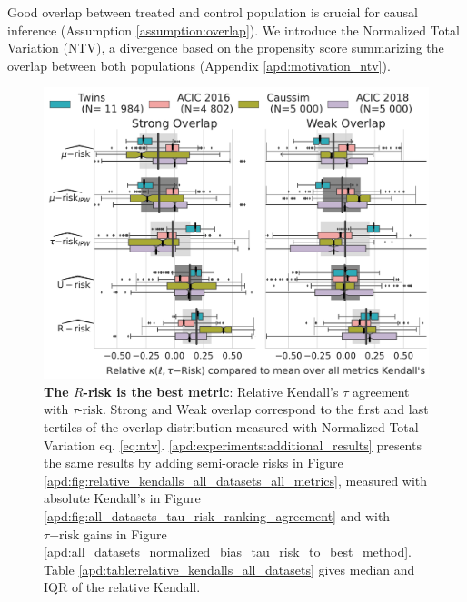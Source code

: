 \documentclass[a4paper,num-refs]{oup-contemporary}%
\begin{document}
Good overlap between treated and control population is crucial for causal
inference (Assumption \ref{assumption:overlap}). We introduce the
Normalized Total Variation (NTV), a divergence based on the propensity score
summarizing the overlap between both populations (Appendix
\ref{apd:motivation_ntv}).

\begin{figure}[!b]
    \centering\begin{minipage}{\linewidth}
        \includegraphics[width=\linewidth]{_1_r_risk_domination_mrisks_by_ds_feasible.pdf}
    \end{minipage}
    \caption{\textbf{The $R$-risk is the best metric}: Relative Kendall's $\tau$ agreement with $\tau\text{-risk}$.
        Strong and Weak overlap correspond to the first and last tertiles of the overlap distribution measured with
        Normalized Total Variation eq. \ref{eq:ntv}. \ref{apd:experiments:additional_results} presents the same results
        by adding semi-oracle risks in Figure \ref{apd:fig:relative_kendalls_all_datasets_all_metrics}, measured with
        absolute Kendall's in Figure \ref{apd:fig:all_datasets_tau_risk_ranking_agreement} and with $\tau\mathrm{-risk}$
        gains in Figure \ref{apd:all_datasets_normalized_bias_tau_risk_to_best_method}. Table
        \ref{apd:table:relative_kendalls_all_datasets} gives median and
        IQR of the relative Kendall.}\label{fig:relative_kendalls_all_datasets}
\end{figure}
\end{document}
